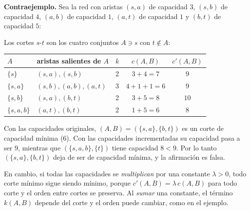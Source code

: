 \textbf{Contraejemplo.} Sea la red con aristas $(s,a)$ de capacidad $3$, $(s,b)$ de capacidad $4$, $(a,b)$ de capacidad $1$, $(a,t)$ de capacidad $1$ y $(b,t)$ de capacidad $5$:

\begin{center}
\end{center}

Los cortes $s$-$t$ son los cuatro conjuntos $A\ni s$ con $t\notin A$:

\begin{center}
\begin{tabular}{lllcc}
\toprule
$A$ & aristas salientes de $A$ & $k$ & $c(A,B)$ & $c'(A,B)$ \\
\midrule
$\{s\}$ & $(s,a),(s,b)$ & 2 & $3+4=7$ & $9$ \\
$\{s,a\}$ & $(s,b),(a,b),(a,t)$ & 3 & $4+1+1=6$ & $9$ \\
$\{s,b\}$ & $(s,a),(b,t)$ & 2 & $3+5=8$ & $10$ \\
$\{s,a,b\}$ & $(a,t),(b,t)$ & 2 & $1+5=6$ & $8$ \\
\bottomrule
\end{tabular}
\end{center}

Con las capacidades originales, $(A,B)=(\{s,a\},\{b,t\})$ es un corte de capacidad mínima ($6$). Con las capacidades incrementadas su capacidad pasa a ser $9$, mientras que $(\{s,a,b\},\{t\})$ tiene capacidad $8<9$. Por lo tanto $(\{s,a\},\{b,t\})$ deja de ser de capacidad mínima, y la afirmación es falsa.

\begin{observacion}
En cambio, si todas las capacidades se \emph{multiplican} por una constante $\lambda>0$, todo corte mínimo sigue siendo mínimo, porque $c'(A,B)=\lambda\, c(A,B)$ para todo corte y el orden entre cortes se preserva. Al \emph{sumar} una constante, el término $k(A,B)$ depende del corte y el orden puede cambiar, como en el ejemplo.
\end{observacion}

